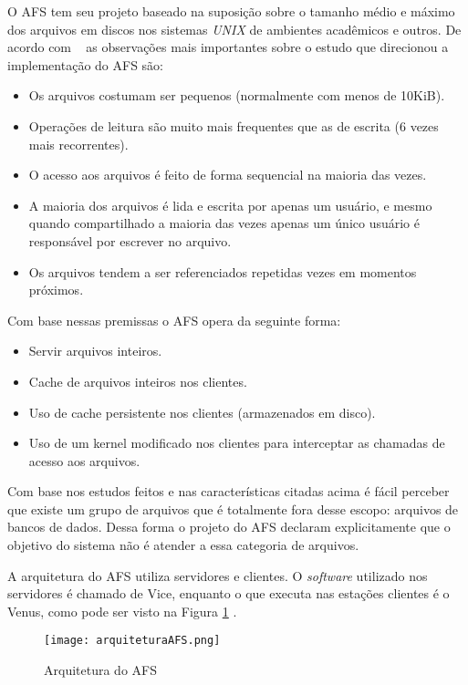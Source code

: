     O AFS tem seu projeto baseado na suposição sobre o tamanho médio e máximo dos arquivos em discos nos sistemas \textit{UNIX} de ambientes acadêmicos e outros. De acordo com ~\cite{coulouris} as observações mais importantes sobre o estudo que direcionou a implementação do AFS são:
    \begin{itemize}
        \item Os arquivos costumam ser pequenos (normalmente com menos de 10KiB).
        \item Operações de leitura são muito mais frequentes que as de escrita (6 vezes mais recorrentes).
        \item O acesso aos arquivos é feito de forma sequencial na maioria das vezes.
        \item A maioria dos arquivos é lida e escrita por apenas um usuário, e mesmo quando compartilhado a maioria das vezes apenas um único usuário é responsável por escrever no arquivo.
        \item Os arquivos tendem a ser referenciados repetidas vezes em momentos próximos.
    \end{itemize}
    
    Com base nessas premissas o AFS opera da seguinte forma:
    \begin{itemize}
        \item Servir arquivos inteiros.
        \item Cache de arquivos inteiros nos clientes.
        \item Uso de cache persistente nos clientes (armazenados em disco).
        \item Uso de um kernel modificado nos clientes para interceptar as chamadas de acesso aos arquivos.
    \end{itemize}
    
    Com base nos estudos feitos e nas características citadas acima é fácil perceber que existe um grupo de arquivos que é totalmente fora desse escopo: arquivos de bancos de dados. Dessa forma o projeto do AFS declaram explicitamente que o objetivo do sistema não é atender a essa categoria de arquivos.
    
    A arquitetura do AFS utiliza servidores e clientes. O \textit{software} utilizado nos servidores é chamado de Vice, enquanto o que executa nas estações clientes é o Venus, como pode ser visto na Figura \ref{fig:arquiteturaAFS} .
    
    \begin{figure}[h]
        \centering
        \texttt{[image: arquiteturaAFS.png]}
        \caption{Arquitetura do AFS ~\cite{coulouris}}
        \label{fig:arquiteturaAFS}
    \end{figure}
    
